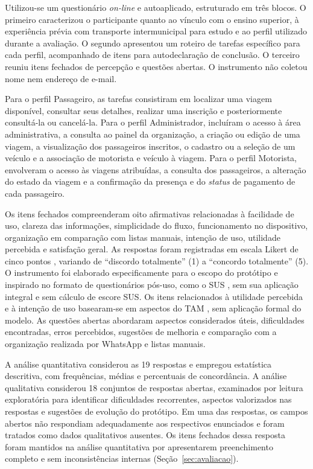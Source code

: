 \documentclass[a4paper,12pt]{article}
\begin{document}
Utilizou-se um questionário \textit{on-line} e autoaplicado, estruturado em três blocos. O primeiro caracterizou o participante quanto ao vínculo com o ensino superior, à experiência prévia com transporte intermunicipal para estudo e ao perfil utilizado durante a avaliação. O segundo apresentou um roteiro de tarefas específico para cada perfil, acompanhado de itens para autodeclaração de conclusão. O terceiro reuniu itens fechados de percepção e questões abertas. O instrumento não coletou nome nem endereço de e-mail.

Para o perfil Passageiro, as tarefas consistiram em localizar uma viagem disponível, consultar seus detalhes, realizar uma inscrição e posteriormente consultá-la ou cancelá-la. Para o perfil Administrador, incluíram o acesso à área administrativa, a consulta ao painel da organização, a criação ou edição de uma viagem, a visualização dos passageiros inscritos, o cadastro ou a seleção de um veículo e a associação de motorista e veículo à viagem. Para o perfil Motorista, envolveram o acesso às viagens atribuídas, a consulta dos passageiros, a alteração do estado da viagem e a confirmação da presença e do \textit{status} de pagamento de cada passageiro.

Os itens fechados compreenderam oito afirmativas relacionadas à facilidade de uso, clareza das informações, simplicidade do fluxo, funcionamento no dispositivo, organização em comparação com listas manuais, intenção de uso, utilidade percebida e satisfação geral. As respostas foram registradas em escala Likert de cinco pontos \cite{likert1932}, variando de ``discordo totalmente'' (1) a ``concordo totalmente'' (5). O instrumento foi elaborado especificamente para o escopo do protótipo e inspirado no formato de questionários pós-uso, como o SUS \cite{brooke1996}, sem sua aplicação integral e sem cálculo de escore SUS. Os itens relacionados à utilidade percebida e à intenção de uso basearam-se em aspectos do TAM \cite{davis1989}, sem aplicação formal do modelo. As questões abertas abordaram aspectos considerados úteis, dificuldades encontradas, erros percebidos, sugestões de melhoria e comparação com a organização realizada por WhatsApp e listas manuais.

A análise quantitativa considerou as 19 respostas e empregou estatística descritiva, com frequências, médias e percentuais de concordância. A análise qualitativa considerou 18 conjuntos de respostas abertas, examinados por leitura exploratória para identificar dificuldades recorrentes, aspectos valorizados nas respostas e sugestões de evolução do protótipo. Em uma das respostas, os campos abertos não respondiam adequadamente aos respectivos enunciados e foram tratados como dados qualitativos ausentes. Os itens fechados dessa resposta foram mantidos na análise quantitativa por apresentarem preenchimento completo e sem inconsistências internas (Seção~\ref{sec:avaliacao}).
\end{document}
